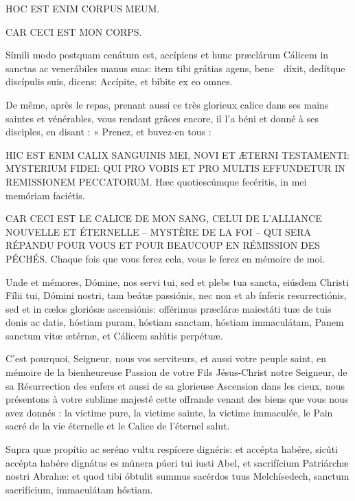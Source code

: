\documentclass[twoside]{article}
\begin{document}
\begin{paracol}{2}
\switchcolumn*

HOC EST ENIM CORPUS MEUM.

\switchcolumn

CAR CECI EST MON CORPS.

\switchcolumn*

Símili modo postquam cenátum est, accípiens et hunc præclárum Cálicem in sanctas ac venerábiles manus suas: item tibi grátias agens, bene~\cc~díxit, dedítque discípulis suis, dicens: Accípite, et bíbite ex eo omnes.

\switchcolumn

De même, après le repas, prenant aussi ce très glorieux calice dans ses mains saintes et vénérables, vous rendant grâces encore, il l’a béni et donné à ses disciples, en disant :
« Prenez, et buvez-en tous :

\switchcolumn*

HIC EST ENIM CALIX SANGUINIS MEI, NOVI ET ÆTERNI TESTAMENTI: MYSTERIUM FIDEI: QUI PRO VOBIS ET PRO MULTIS EFFUNDETUR IN REMISSIONEM PECCATORUM.
Hæc quotiescúmque fecéritis, in mei memóriam faciétis.

\switchcolumn

CAR CECI EST LE CALICE DE MON SANG,
CELUI DE L’ALLIANCE NOUVELLE ET ÉTERNELLE
– MYSTÈRE DE LA FOI –
QUI SERA RÉPANDU POUR VOUS ET POUR BEAUCOUP
EN RÉMISSION DES PÉCHÉS.
Chaque fois que vous ferez cela, vous le ferez en mémoire de moi.

\switchcolumn*

Unde et mémores, Dómine, nos servi tui, sed et plebs tua sancta, eiúsdem Christi Fílii tui, Dómini nostri, tam beátæ passiónis, nec non et ab ínferis resurrectiónis, sed et in cælos gloriósæ ascensiónis: offérimus præcláræ maiestáti tuæ de tuis donis ac datis, hóstiam \cc puram, hóstiam \cc sanctam, hóstiam \cc immaculátam, Panem \cc sanctum vitæ ætérnæ, et Cálicem \cc salútis perpétuæ.

\switchcolumn

C’est pourquoi, Seigneur, nous vos serviteurs, et aussi votre peuple saint, en mémoire de la bienheureuse Passion de votre Fils Jésus-Christ notre Seigneur, de sa Résurrection des enfers et aussi de sa glorieuse Ascension dans les cieux, nous présentons à votre sublime majesté cette offrande venant des biens que vous nous avez donnés : la victime pure, la victime sainte, la victime immaculée, le Pain sacré de la vie éternelle et le Calice de l’éternel salut.

\switchcolumn*

Supra quæ propítio ac seréno vultu respícere dignéris: et accépta habére, sicúti accépta habére dignátus es múnera púeri tui iusti Abel, et sacrifícium Patriárchæ nostri Abrahæ: et quod tibi óbtulit summus sacérdos tuus Melchísedech, sanctum sacrifícium, immaculátam hóstiam.


\end{paracol}
\end{document}
